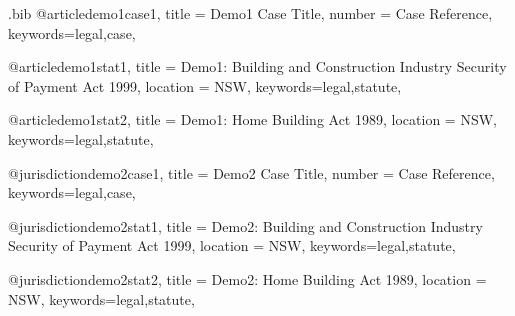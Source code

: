 

\begin{filecontents*}{\jobname.bib}
@article{demo1case1,
title = {Demo1 Case Title},
number = {Case Reference},
keywords={legal,case},
}

@article{demo1stat1,
title = {Demo1: Building and Construction Industry Security of Payment Act 1999},
location = {NSW},
keywords={legal,statute},
}

@article{demo1stat2,
title = {Demo1: Home Building Act 1989},
location = {NSW},
keywords={legal,statute},
}



@jurisdiction{demo2case1,
title = {Demo2 Case Title},
number = {Case Reference},
keywords={legal,case},
}

@jurisdiction{demo2stat1,
title = {Demo2: Building and Construction Industry Security of Payment Act 1999},
location = {NSW},
keywords={legal,statute},
}

@jurisdiction{demo2stat2,
title = {Demo2: Home Building Act 1989},
location = {NSW},
keywords={legal,statute},
}

\end{filecontents*}



\documentclass[12pt,varwidth,border=6pt]{standalone}
\newcommand\rulesep{\rule{0.4\textwidth}{.4pt}}
\usepackage[table]{xcolor}
\pagecolor{blue!3}
\usepackage{fontspec}
\setmainfont{Noto Serif}




\newcommand\abibname{numeric}
\newcommand\abibstyle{style=\abibname}
\usepackage[
	\abibstyle , 
	indexing=cite,
	citetracker=true,
	ibidtracker=true,
	pagetracker=true,
	idemtracker=true,
	opcittracker=true,
	loccittracker=true,
	autocite=footnote,
		]{biblatex}




				


\usepackage[
				bookmarks,
            colorlinks=true,        
            allcolors = black,  
            citecolor=blue, 
            hyperindex=false,       
]{hyperref}








x  and  and .

x  and  and .

x \parencite{reese,aristotle:anima}.

\printbibliography%
 
